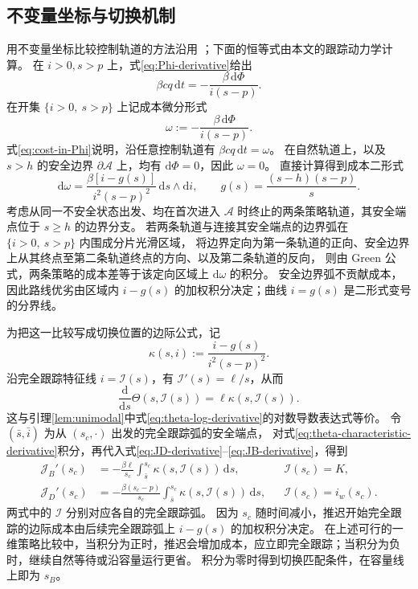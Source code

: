 \documentclass[11pt,a4paper,UTF8]{ctexart}
\theoremstyle{definition}
\newcommand{\Acal}{\mathcal A}
\newcommand{\dd}{\,\mathrm d}
\begin{document}
\subsection{不变量坐标与切换机制}
\label{sec:switching-mechanism}
用不变量坐标比较控制轨道的方法沿用 \citet{Angulo2021}；下面的恒等式由本文的跟踪动力学计算。
在 $i>0,s>p$ 上，式\eqref{eq:Phi-derivative}给出
\begin{equation}
 \beta cq\dd t=-\frac{\beta\,\mathrm d\Phi}{i(s-p)}.
 \label{eq:cost-in-Phi}
\end{equation}
在开集 $\{i>0,\ s>p\}$ 上记成本微分形式
\begin{equation}
 \omega:=-\frac{\beta\,\mathrm d\Phi}{i(s-p)}.
 \label{eq:cost-one-form}
\end{equation}
式\eqref{eq:cost-in-Phi}说明，沿任意控制轨道有 $\beta cq\dd t=\omega$。
在自然轨道上，以及 $s>h$ 的安全边界 $\partial\Acal$ 上，均有 $\mathrm d\Phi=0$，因此 $\omega=0$。
直接计算得到成本二形式
\begin{equation}
 \mathrm d\omega
 =\frac{\beta[i-g(s)]}{i^2(s-p)^2}\,\mathrm ds\wedge\mathrm di,
 \qquad g(s)=\frac{(s-h)(s-p)}s.
 \label{eq:cost-two-form}
\end{equation}
考虑从同一不安全状态出发、均在首次进入 $\Acal$ 时终止的两条策略轨道，其安全端点位于 $s\ge h$ 的边界分支。
若两条轨道与连接其安全端点的边界弧在 $\{i>0,\ s>p\}$ 内围成分片光滑区域，
将边界定向为第一条轨道的正向、安全边界上从其终点至第二条轨道终点的方向、以及第二条轨道的反向，
则由 Green 公式，两条策略的成本差等于该定向区域上 $\mathrm d\omega$ 的积分。
安全边界弧不贡献成本，因此路线优劣由区域内 $i-g(s)$ 的加权积分决定；曲线 $i=g(s)$ 是二形式变号的分界线。

为把这一比较写成切换位置的边际公式，记
\begin{equation}
 \kappa(s,i):=\frac{i-g(s)}{i^2(s-p)^2}.
 \label{eq:mechanism-kappa}
\end{equation}
沿完全跟踪特征线 $i=\mathcal I(s)$，有 $\mathcal I'(s)=\ell/s$，从而
\begin{equation}
 \frac{\mathrm d}{\mathrm ds}\Theta(s,\mathcal I(s))
 =\ell\kappa(s,\mathcal I(s)).
 \label{eq:theta-characteristic-derivative}
\end{equation}
这与引理\ref{lem:unimodal}中式\eqref{eq:theta-log-derivative}的对数导数表达式等价。
令 $(\bar s,\bar i)$ 为从 $(s_c,\cdot)$ 出发的完全跟踪弧的安全端点，
对式\eqref{eq:theta-characteristic-derivative}积分，再代入式\eqref{eq:JD-derivative}--\eqref{eq:JB-derivative}，得到
\begin{align}
 \mathcal J_B'(s_c)
 &=-\frac{\beta\ell}{s_c}
   \int_{\bar s}^{s_c}\kappa(s,\mathcal I(s))\dd s,
 &&\mathcal I(s_c)=K,
 \label{eq:JB-curvature-integral}\\
 \mathcal J_D'(s_c)
 &=-\frac{\beta(s_c-p)}{s_c}
   \int_{\bar s}^{s_c}\kappa(s,\mathcal I(s))\dd s,
 &&\mathcal I(s_c)=i_w(s_c).
 \label{eq:JD-curvature-integral}
\end{align}
两式中的 $\mathcal I$ 分别对应各自的完全跟踪弧。
因为 $s_c$ 随时间减小，推迟开始完全跟踪的边际成本由后续完全跟踪弧上 $i-g(s)$ 的加权积分决定。
在上述可行的一维策略比较中，当积分为正时，推迟会增加成本，应立即完全跟踪；当积分为负时，继续自然等待或沿容量运行更省。
积分为零时得到切换匹配条件，在容量线上即为 $s_B$。
\end{document}

